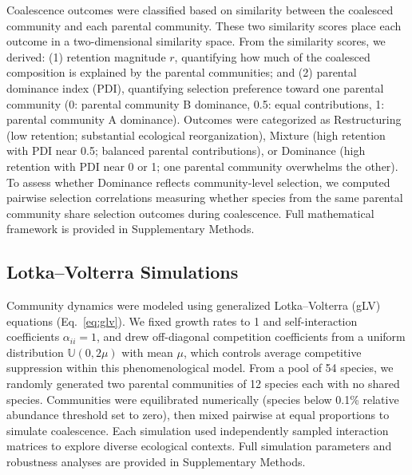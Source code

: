 Coalescence outcomes were classified based on similarity between the coalesced community and each parental community.  These two similarity scores place each outcome in a two-dimensional similarity space. From the similarity scores, we derived: (1) retention magnitude $r$, quantifying how much of the coalesced composition is explained by the parental communities; and (2) parental dominance index (PDI), quantifying selection preference toward one parental community (0: parental community B dominance, 0.5: equal contributions, 1: parental community A dominance).  Outcomes were categorized as Restructuring (low retention; substantial ecological reorganization), Mixture (high retention with PDI near 0.5; balanced parental contributions), or Dominance (high retention with PDI near 0 or 1; one parental community overwhelms the other). To assess whether Dominance reflects community-level selection, we computed pairwise selection correlations measuring whether species from the same parental community share selection outcomes during coalescence. Full mathematical framework is provided in Supplementary Methods.


\subsection*{Lotka--Volterra Simulations}
\label{sec:methods:simulations}

Community dynamics were modeled using generalized Lotka--Volterra (gLV) equations (Eq.~\ref{eq:glv}). We fixed growth rates to 1 and self-interaction coefficients $\alpha_{ii} = 1$, and drew off-diagonal competition coefficients from a uniform distribution $\mathbb{U}(0, 2\mu)$ with mean $\mu$, which controls average competitive suppression within this phenomenological model. From a pool of 54 species, we randomly generated two parental communities of 12 species each with no shared species. Communities were equilibrated numerically (species below 0.1\% relative abundance threshold set to zero), then mixed pairwise at equal proportions to simulate coalescence. Each simulation used independently sampled interaction matrices to explore diverse ecological contexts. Full simulation parameters and robustness analyses are provided in Supplementary Methods.


